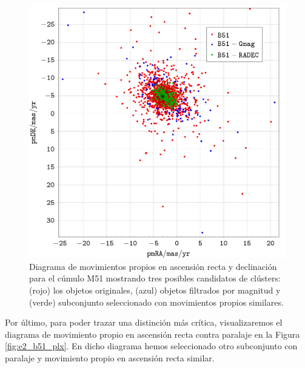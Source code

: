 \documentclass[a4paper,fleqn,usenatbib]{mnras}
\begin{document}
\begin{figure}
  \includegraphics[width=\linewidth]{img/b51_radec}
  \caption{Diagrama de movimientos propios en ascensión recta y declinación para el cúmulo M51 mostrando tres posibles candidatos de clústers: (rojo) los objetos originales, (azul) objetos filtrados por magnitud y (verde) subconjunto seleccionado con movimientos propios similares.}
  \label{fig:e2_b51_radec}
\end{figure}

Por último, para poder trazar una distinción más crítica, visualizaremos el diagrama de movimiento propio en ascensión recta contra paralaje en la Figura \ref{fig:e2_b51_plx}. En dicho diagrama hemos seleccionado otro subconjunto con paralaje y movimiento propio en ascensión recta similar.
\end{document}
